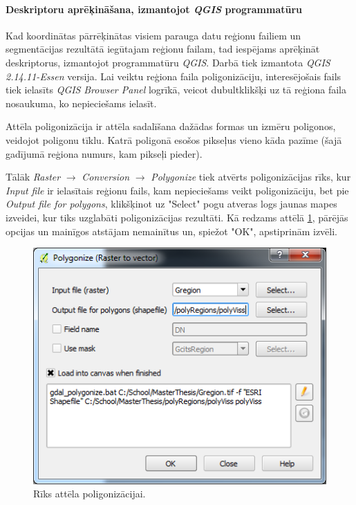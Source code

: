 \documentclass[12pt,paper=a4]{report}
\begin{document}
\paragraph{Deskriptoru aprēķināšana, izmantojot \textit{QGIS} programmatūru}
Kad koordinātas pārrēķinātas visiem parauga datu reģionu failiem un segmentācijas rezultātā iegūtajam reģionu failam, tad iespējams aprēķināt deskriptorus, izmantojot programmatūru \textit{QGIS}. Darbā tiek izmantota \textit{QGIS 2.14.11-Essen} versija. Lai veiktu reģiona faila poligonizāciju, interesējošais fails tiek ielasīts \textit{QGIS} \textit{Browser Panel} logrīkā, veicot dubultklikšķi uz tā reģiona faila nosaukuma, ko nepieciešams ielasīt.\par
Attēla poligonizācija ir attēla sadalīšana dažādas formas un izmēru poligonos, veidojot poligonu tīklu. Katrā poligonā esošos pikseļus vieno kāda pazīme (šajā gadījumā reģiona numurs, kam pikseļi pieder). \cite{poly}\par
Tālāk \textit{Raster} $\rightarrow$ \textit{Conversion} $\rightarrow$ \textit{Polygonize} tiek atvērts poligonizācijas rīks, kur \textit{Input file} ir ielasītais reģionu fails, kam nepieciešams veikt poligonizāciju, bet pie \textit{Output file for polygons}, klikšķinot uz "Select" pogu atveras logs jaunas mapes izveidei, kur tiks uzglabāti poligonizācijas rezultāti. Kā redzams attēlā \ref{fig:poligonizacija}, pārējās opcijas un mainīgos atstājam nemainītus un, spiežot "OK", apstiprinām izvēli.
\begin{figure}[h!]
\centering
\includegraphics[scale=0.7]{polygonize} 
\caption{Rīks attēla poligonizācijai.}
\label{fig:poligonizacija}
\end{figure}\par
\end{document}
